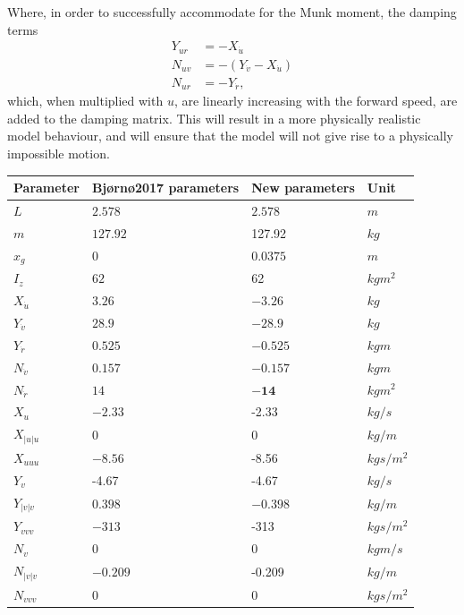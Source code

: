 Where, in order to successfully accommodate for the Munk moment, the damping terms
\begin{align}
Y_{ur} &= -X_{\dot{u}}\\
N_{uv} &= - (Y_{\dot{v}} - X_{\dot{u}})\\
N_{ur} &= -Y_{\dot{r}},
\end{align}
which, when multiplied with $u$, are linearly increasing with the forward speed, are added to the damping matrix. This will result in a more physically realistic model behaviour, and will ensure that the model will not give rise to a physically impossible motion. \\
\begin{table}[h!]
\centering 
\begin{tabular}{| p{2cm} | p{2cm} | p{3cm} | p{2cm}|}
\hline
\textbf{Parameter}& \textbf{Bj\o rn\o2017 parameters \cite{bjørnø2017}} &  \textbf{New parameters} &\textbf{Unit}   \\ \hline\hline
$L$ & $2.578$ & $2.578$ & $m$  \\ \hline
$m$ & $127.92$ &127.92 & $kg$ \\ \hline
$x_g$ & $0$ & $\boldsymbol{0.0375}$ & $m$  \\ \hline
$I_z$ & $62$& 62 & $kgm^2$  \\ \hline
$X_{\dot{u}}$ &$3.26$& $\boldsymbol{-3.26}$ & $kg $ \\ \hline
$Y_{\dot{v}}$ &$28.9$& $\boldsymbol{-28.9}$ & $kg$  \\ \hline
$Y_{\dot{r}}$ & $0.525$ & $\boldsymbol{-0.525}$ & $kgm$  \\ \hline
$N_{\dot{v}}$ &$0.157$ &$\boldsymbol{-0.157}$ & $kgm$ \\ \hline
$N_{\dot{r}}$ & $14$ &$\boldsymbol{-14}$ & $kgm^2$  \\ \hline
$X_u$ & $ -2.33$ &-2.33 &$kg/s$  \\ \hline
$X_{|u|u}$ & $0$ &0& $kg/m $ \\ \hline
$X_{uuu}$ & $-8.56$ & -8.56&$kgs/m^2$  \\ \hline
$Y_v$ & -4.67 &-4.67 &$kg/s$\\ \hline
$Y_{|v|v}$ & $0.398$ & $\boldsymbol{-0.398}$ & $kg/m$\\ \hline
$Y_{vvv}$ & $-313$ & -313& $kgs/m^2$\\ \hline
$N_v$ & $0$ & 0 &$kgm/s$\\ \hline
$N_{|v|v}$ & $-0.209$ &-0.209 & $kg/m$\\ \hline
$N_{vvv}$ & $0$&0 & $kgs/m^2$\\ \hline

\end{tabular}
\end{table}
